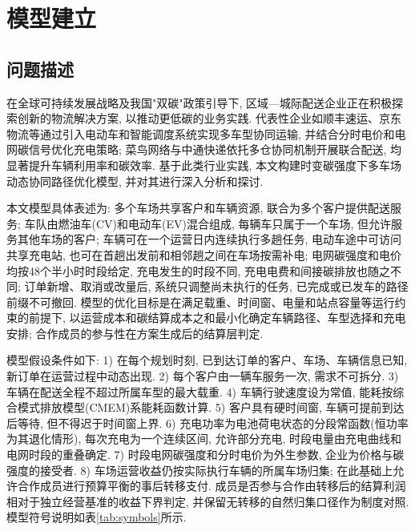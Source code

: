 \documentclass{setp-new}
\begin{document}

\section{模型建立}

\subsection{问题描述}

在全球可持续发展战略及我国"双碳"政策引导下,
区域—城际配送企业正在积极探索创新的物流解决方案, 以推动更低碳的业务实践.
代表性企业如顺丰速运、京东物流等通过引入电动车和智能调度系统实现多车型协同运输,
并结合分时电价和电网碳信号优化充电策略;
菜鸟网络与中通快递依托多仓协同机制开展联合配送, 均显著提升车辆利用率和碳效率.
基于此类行业实践, 本文构建时变碳强度下多车场动态协同路径优化模型, 并对其进行深入分析和探讨.

本文模型具体表述为:
多个车场共享客户和车辆资源, 联合为多个客户提供配送服务;
车队由燃油车(CV)和电动车(EV)混合组成, 每辆车只属于一个车场, 但允许服务其他车场的客户;
车辆可在一个运营日内连续执行多趟任务,
电动车途中可访问共享充电站, 也可在首趟出发前和相邻趟之间在车场按需补电;
电网碳强度和电价均按48个半小时时段给定,
充电发生的时段不同, 充电电费和间接碳排放也随之不同;
订单新增、取消或改量后, 系统只调整尚未执行的任务, 已完成或已发车的路径前缀不可撤回.
模型的优化目标是在满足载重、时间窗、电量和站点容量等运行约束的前提下,
以运营成本和碳结算成本之和最小化确定车辆路径、车型选择和充电安排;
合作成员的参与性在方案生成后的结算层判定.

模型假设条件如下:
1) 在每个规划时刻, 已到达订单的客户、车场、车辆信息已知, 新订单在运营过程中动态出现.
2) 每个客户由一辆车服务一次, 需求不可拆分.
3) 车辆在配送全程不超过所属车型的最大载重.
4) 车辆行驶速度设为常值, 能耗按综合模式排放模型(CMEM)系能耗函数\cite{ref:27,ref:36}计算.
5) 客户具有硬时间窗, 车辆可提前到达后等待, 但不得迟于时间窗上界.
6) 充电功率为电池荷电状态的分段常函数(恒功率为其退化情形),
每次充电为一个连续区间, 允许部分充电, 时段电量由充电曲线和电网时段的重叠确定.
7) 时段电网碳强度和分时电价为外生参数, 企业为价格与碳强度的接受者.
8) 车场运营收益仍按实际执行车辆的所属车场归集;
在此基础上允许合作成员进行预算平衡的事后转移支付.
成员是否参与合作由转移后的结算利润相对于独立经营基准的收益下界判定,
并保留无转移的自然归集口径作为制度对照.
模型符号说明如表\ref{tab:symbols}所示.
\end{document}
